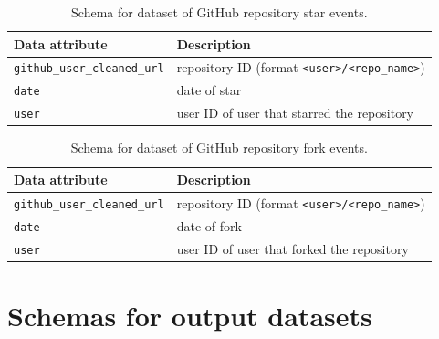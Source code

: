 \documentclass[10pt,a4paper]{scrartcl}
\begin{document}
\begin{table}
    \centering
    \begin{tabular}{l|l}
        \hline
        Data attribute & Description \\
        \hline
        \verb|github_user_cleaned_url| & repository ID (format \verb|<user>/<repo_name>|) \\
        \verb|date| & date of star \\
        \verb|user| & user ID of user that starred the repository \\
        \hline
    \end{tabular}
    \caption{Schema for dataset of GitHub repository star events.}
    \label{table:stars}
\end{table}

\begin{table}
    \centering
    \begin{tabular}{l|l}
        \hline
        Data attribute & Description \\
        \hline
        \verb|github_user_cleaned_url| & repository ID (format \verb|<user>/<repo_name>|) \\
        \verb|date| & date of fork \\
        \verb|user| & user ID of user that forked the repository \\
        \hline
    \end{tabular}
    \caption{Schema for dataset of GitHub repository fork events.}
    \label{table:forks}
\end{table}

\section{Schemas for output datasets}
\label{section:app_schemas_output}

\end{document}

